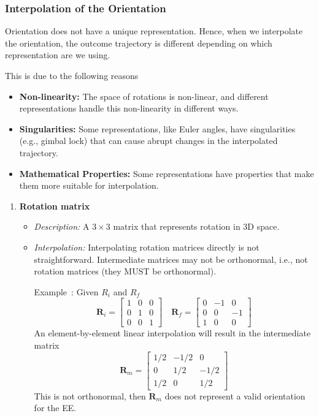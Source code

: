 \documentclass[10pt, aspectratio=169]{beamer}
\theoremstyle{remark}
\theoremstyle{definition}
\begin{document}
\begin{frame}[allowframebreaks]
\frametitle{Interpolation of the Orientation}

Orientation does not have a unique representation. Hence, when we interpolate the orientation, the outcome trajectory is different depending on which representation are we using.

This is due to the following reasons

\begin{itemize}
    \item \textbf{Non-linearity:} The space of rotations is non-linear, and different representations handle this non-linearity in different ways. 
    \item \textbf{Singularities:} Some representations, like Euler angles, have singularities (e.g., gimbal lock) that can cause abrupt changes in the interpolated trajectory.
    \item \textbf{Mathematical Properties:} Some representations have properties that make them more suitable for interpolation. 
\end{itemize}

\framebreak

\begin{enumerate}
    \item \textbf{Rotation matrix}
    \begin{itemize}
        \item \textit{Description:} A $3 \times 3$ matrix that represents rotation in 3D space.
        \item \textit{Interpolation:} Interpolating rotation matrices directly is not straightforward. Intermediate matrices may not be orthonormal, i.e., not rotation matrices (they MUST be orthonormal).

        Example~\cite{barrientos2007fundamentos}: Given $R_i$ and $R_f$
        $$
        \mathbf{R}_i = \begin{bmatrix}
        1 & 0 & 0 \\
        0 & 1 & 0 \\
        0 & 0 & 1
        \end{bmatrix}
        \quad
        \mathbf{R}_f = \begin{bmatrix}
        0 & -1 & 0 \\
        0 & 0 & -1 \\
        1 & 0 & 0
        \end{bmatrix}
        $$
        An element-by-element linear interpolation will result in the intermediate matrix 
        $$
        \mathbf{R}_m = \begin{bmatrix}
        1/2 & -1/2 & 0 \\
        0 & 1/2 & -1/2 \\
        1/2 & 0 & 1/2
        \end{bmatrix}
        $$
        This is not orthonormal, then $\mathbf{R}_m$ does not represent a valid orientation for the EE.
    \end{itemize}


\end{enumerate}
\end{frame}
\end{document}
